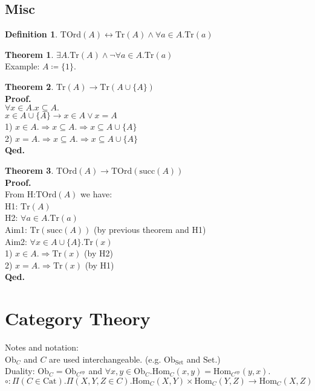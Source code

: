 \documentclass[10pt,a4paper]{article}
\theoremstyle{definition}
\newtheorem{definition}{Definition}[section]
\newtheorem{theorem}{Theorem}[section]
\newcommand{\Ob}{{\mbox{Ob}}}
\newcommand{\Cat}{{\mbox{Cat}}}
\newcommand{\Hom}{{\mbox{Hom}}}
\newcommand{\op}{{\mbox{op}}}
\newcommand{\Set}{{\mbox{Set}}}
\newcommand{\myprf}{\noindent\textbf{Proof.}}
\newcommand{\myqed}{\noindent\textbf{Qed.}}
\newcommand{\TOrd}{{\mbox{TOrd}}}
\newcommand{\Tr}{{\mbox{Tr}}}
\newcommand{\mysucc}{{\mbox{succ}}}
\begin{document}
\subsection{Misc}
\begin{definition}
$\TOrd(A) \longleftrightarrow \Tr(A)\land \forall a\in A. \Tr(a)$
\end{definition}
\begin{theorem}
$\exists A. \Tr(A) \land \neg \forall a\in A. \Tr(a)$
\\Example: $A\coloneqq \{1\}$.
\end{theorem}
\begin{theorem}
$\Tr(A) \longrightarrow \Tr(A\cup\{A\})$
\\\myprf
\\$\forall x\in A.x\subseteq A.$
\\$x\in A\cup\{A\} \longrightarrow x\in A \lor x=A$
\\1) $x\in A. \Longrightarrow x\subseteq A. \Longrightarrow x\subseteq A\cup\{A\}$
\\2) $x = A. \Longrightarrow x\subseteq A. \Longrightarrow x\subseteq A\cup\{A\}$
\\\myqed
\end{theorem}
\begin{theorem}
  $ \TOrd(A) \longrightarrow \TOrd(\mysucc(A))$
\\\myprf
\\From H:$\TOrd(A)$ we have:
\\H1: $\Tr(A)$
\\H2: $\forall a\in A. \Tr(a)$
\\Aim1: $\Tr(\mysucc(A))$ (by previous theorem and H1)
\\Aim2: $\forall x\in A\cup\{A\}. \Tr(x)$
\\1) $x\in A. \Longrightarrow \Tr(x)$ (by H2)
\\2) $x = A. \Longrightarrow \Tr(x)$ (by H1) %
\\\myqed
\end{theorem}
\section{Category Theory}
Notes and notation:\\
$\Ob_C$ and $C$ are used interchangeable. (e.g. $\Ob_\Set$ and $\Set$.)\\
Duality: $\Ob_C = \Ob_{C^\op}$ and 
 $\forall x,y \in \Ob_C. \Hom_C(x,y) = \Hom_{C^\op}(y,x)$.\\
$\circ : \Pi(C\in \Cat).\Pi(X,Y,Z\in C).\Hom_C(X,Y)\times\Hom_C(Y,Z)\to\Hom_C(X,Z)$
\end{document}
